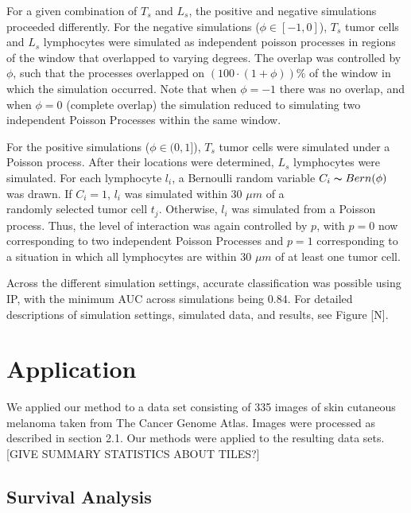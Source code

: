 \documentclass[
]{book}
\begin{document}
For a given combination of \(T_s\) and \(L_s\), the positive and
negative simulations proceeded differently. For the negative
simulations (\(\phi \in [-1, 0]\)), \(T_s\) tumor cells and \(L_s\)
lymphocytes were simulated as independent poisson processes in
regions of the window that overlapped to varying degrees. The
overlap was controlled by \(\phi\), such that the processes overlapped
on \((100 \cdot (1 + \phi)) \%\) of the window in which the
simulation occurred. Note that when \(\phi = -1\) there was no overlap,
and when \(\phi = 0\) (complete overlap) the simulation reduced to
simulating two independent Poisson Processes within the same window.

For the positive simulations (\(\phi \in (0, 1]\)), \(T_s\) tumor cells
were simulated under a Poisson process. After their locations were
determined, \(L_s\) lymphocytes were simulated. For each lymphocyte
\(l_i\), a Bernoulli random variable \(C_i \thicksim Bern(\phi)\) was
drawn. If \(C_i = 1\), \(l_i\) was simulated within \(30\) \(\mu m\) of a\\
randomly selected tumor cell \(t_j\). Otherwise, \(l_i\) was simulated
from a Poisson process. Thus, the level of interaction was again
controlled by \(p\), with \(p = 0\) now corresponding to two independent
Poisson Processes and \(p = 1\) corresponding to a situation in which
all lymphocytes are within \(30\) \(\mu m\) of at least one tumor cell.

Across the different simulation settings, accurate classification
was possible using IP, with the minimum AUC across simulations
being \(0.84\). For detailed descriptions of simulation settings,
simulated data, and results, see Figure {[}N{]}.

\hypertarget{application}{%
\section{Application}\label{application}}

We applied our method to a data set consisting of 335 images of
skin cutaneous melanoma taken from The Cancer Genome Atlas. Images
were processed as described in section 2.1. Our methods were applied
to the resulting data sets. {[}GIVE SUMMARY STATISTICS ABOUT TILES?{]}

\hypertarget{survival-analysis}{%
\subsection{Survival Analysis}\label{survival-analysis}}
\end{document}
